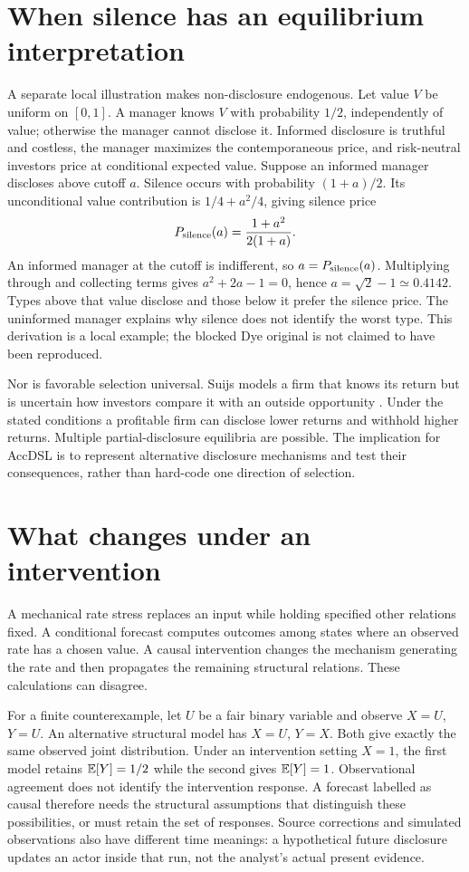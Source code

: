\section{When silence has an equilibrium interpretation}
A separate local illustration makes non-disclosure endogenous. Let value $V$
be uniform on $[0,1]$. A manager knows $V$ with probability $1/2$, independently
of value; otherwise the manager cannot disclose it. Informed disclosure is
truthful and costless, the manager maximizes the contemporaneous price, and
risk-neutral investors price at conditional expected value. Suppose an informed
manager discloses above cutoff $a$. Silence occurs with probability
$(1+a)/2$. Its unconditional value contribution is
$1/4+a^2/4$, giving silence price
\begin{equation}
P_{\rm silence}(a)=\frac{1+a^2}{2(1+a)}.
\end{equation}
An informed manager at the cutoff is indifferent, so $a=P_{\rm silence}(a)$.
Multiplying through and collecting terms gives $a^2+2a-1=0$, hence
$a=\sqrt2-1\simeq0.4142$. Types above that value disclose and those below
it prefer the silence price. The uninformed manager explains why silence
does not identify the worst type. This derivation is a local example; the
blocked Dye original is not claimed to have been reproduced.

Nor is favorable selection universal. Suijs models a firm that knows its
return but is uncertain how investors compare it with an outside opportunity
\cite[Sections~3--4, Proposition~2 and Appendices~A--B]{litclosesuijs}. Under the
stated conditions a profitable firm can disclose lower returns and withhold
higher returns. Multiple partial-disclosure equilibria are possible. The
implication for AccDSL is to represent alternative disclosure mechanisms and
test their consequences, rather than hard-code one direction of selection.

\section{What changes under an intervention}
A mechanical rate stress replaces an input while holding specified other
relations fixed. A conditional forecast computes outcomes among states where
an observed rate has a chosen value. A causal intervention changes the
mechanism generating the rate and then propagates the remaining structural
relations. These calculations can disagree.

For a finite counterexample, let $U$ be a fair binary variable and observe
$X=U$, $Y=U$. An alternative structural model has $X=U$, $Y=X$. Both give
exactly the same observed joint distribution. Under an intervention setting
$X=1$, the first model retains $\mathbb{E}[Y]=1/2$ while the second gives
$\mathbb{E}[Y]=1$. Observational agreement does not identify the intervention
response. A forecast labelled as causal therefore needs the structural
assumptions that distinguish these possibilities, or must retain the set of
responses. Source corrections and simulated observations also have different
time meanings: a hypothetical future disclosure updates an actor inside that
run, not the analyst's actual present evidence.
